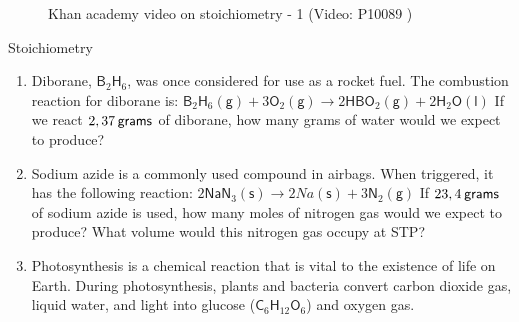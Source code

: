     \noindent
    \vspace{-1cm}
\label{m38712*eip-546}
    \setcounter{subfigure}{0}
	\begin{figure}[H] %
    \textnormal{Khan academy video on stoichiometry - 1}\vspace{.1in} \nopagebreak
  \label{m38712*yt-media4}\label{m38712*yt-video4}
             { (Video:  P10089 )}
 \end{figure}       \par \label{m38712*secfhsst!!!underscore!!!id2276}
    \noindent \vspace{-2cm}
            \begin{exercises}{  Stoichiometry
      }
            \nopagebreak
      \label{m38712*id285393}\begin{enumerate}[noitemsep, label=\textbf{\arabic*}. ] 
            \label{m38712*uid101}\item Diborane, $\mathsf{B}{}_{2}\mathsf{H}{}_{6}$, was once considered for use as a rocket fuel. The combustion reaction for diborane is:
${\mathsf{B}}_{2}{\mathsf{H}}_{6}\left(\mathsf{g}\right)+3{\mathsf{O}}_{2}\left(\mathsf{g}\right)\to 2\mathsf{H}\mathsf{B}{\mathsf{O}}_{2}\left(\mathsf{g}\right)+2{\mathsf{H}}_{2}\mathsf{O}\left(\mathsf{l}\right)$
If we react $2,37\phantom{\rule{2pt}{0ex}}\mathsf{grams}$ of diborane, how many grams of water would we expect to produce?\newline
\label{m38712*uid102}\item Sodium azide is a commonly used compound in airbags. When triggered, it has the following reaction:
$2{\mathsf{NaN}}_{3}\left(\mathsf{s}\right)\to 2Na\left(\mathsf{s}\right)+3{\mathsf{N}}_{2}\left(\mathsf{g}\right)$
If $23,4\phantom{\rule{2pt}{0ex}}\mathsf{grams}$ of sodium azide is used, how many moles of nitrogen gas would we expect to produce? What volume would this nitrogen gas occupy at STP?\newline
\label{m38712*uid103}\item Photosynthesis is a chemical reaction that is vital to the existence of life on Earth. During photosynthesis, plants and bacteria convert carbon dioxide gas, liquid water, and light into glucose ($\mathsf{C}{}_{6}\mathsf{H}{}_{12}\mathsf{O}{}_{6}$) and oxygen gas.
\label{m38712*id285674}\begin{enumerate}[noitemsep, label=\textbf{\alph*}. ] 

\end{enumerate}
\end{enumerate}
\end{exercises}
